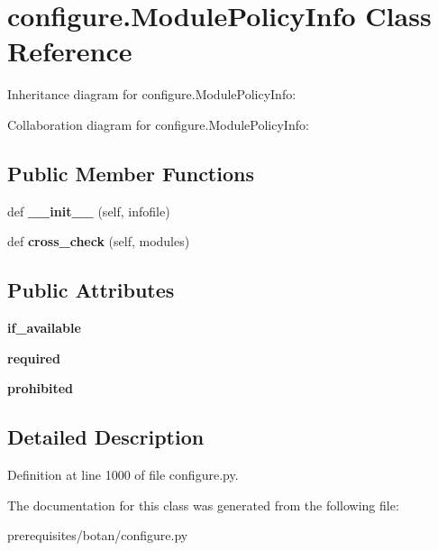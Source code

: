 \hypertarget{classconfigure_1_1_module_policy_info}{}\section{configure.\+Module\+Policy\+Info Class Reference}
\label{classconfigure_1_1_module_policy_info}


Inheritance diagram for configure.\+Module\+Policy\+Info\+:


Collaboration diagram for configure.\+Module\+Policy\+Info\+:
\subsection*{Public Member Functions}
\begin{DoxyCompactItemize}
\item 
\mbox{\label{classconfigure_1_1_module_policy_info_a2cd9174dc1291c60bb7c8cdf704d2100}} 
def {\bfseries \+\_\+\+\_\+init\+\_\+\+\_\+} (self, infofile)
\item 
\mbox{\label{classconfigure_1_1_module_policy_info_a486b0c63c6d4840a2a5c9d17fbe4b4f5}} 
def {\bfseries cross\+\_\+check} (self, modules)
\end{DoxyCompactItemize}
\subsection*{Public Attributes}
\begin{DoxyCompactItemize}
\item 
\mbox{\label{classconfigure_1_1_module_policy_info_a1fe3ed578edf376cf80c76b292c77abb}} 
{\bfseries if\+\_\+available}
\item 
\mbox{\label{classconfigure_1_1_module_policy_info_aee1869a01f4055d0711d44302995adab}} 
{\bfseries required}
\item 
\mbox{\label{classconfigure_1_1_module_policy_info_a562fb265fb399c06ff6f153580861f3b}} 
{\bfseries prohibited}
\end{DoxyCompactItemize}


\subsection{Detailed Description}


Definition at line 1000 of file configure.\+py.



The documentation for this class was generated from the following file\+:\begin{DoxyCompactItemize}
\item 
prerequisites/botan/configure.\+py\end{DoxyCompactItemize}
